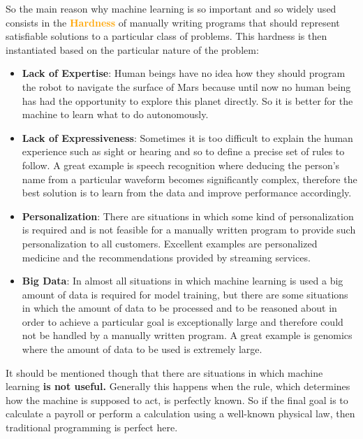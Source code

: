 \vspace{5mm}

So the main reason why machine learning is so important and so widely
used consists in the \textcolor{orange}{\textbf{Hardness}} of manually
writing programs that should represent satisfiable solutions to a
particular class of problems. This hardness is then instantiated based
on the particular nature of the problem:

\newpage

\begin{itemize}
    \item \textbf{Lack of Expertise}: Human beings have no idea how they
          should program the robot to navigate the surface of Mars
          because until now no human being has had the opportunity to
          explore this planet directly. So it is better for the machine
          to learn what to do autonomously.
    \item \textbf{Lack of Expressiveness}: Sometimes it is too difficult
          to explain the human experience such as sight or hearing and
          so to define a precise set of rules to follow. A great example
          is speech recognition where deducing the person's name from a
          particular waveform becomes significantly complex, therefore
          the best solution is to learn from the data and improve
          performance accordingly.
    \item \textbf{Personalization}: There are situations in which some
          kind of personalization is required and is not feasible for a
          manually written program to provide such personalization to all
          customers. Excellent examples are personalized medicine and the
          recommendations provided by streaming services.
    \item \textbf{Big Data}: In almost all situations in which machine
          learning is used a big amount of data is required for model
          training, but there are some situations in which the amount of
          data to be processed and to be reasoned about in order to
          achieve a particular goal is exceptionally large and therefore
          could not be handled by a manually written program. A great
          example is genomics where the amount of data to be used is
          extremely large.
\end{itemize}

\vspace{5mm}

It should be mentioned though that there are situations in which machine
learning \textbf{is not useful.} Generally this happens when the rule,
which determines how the machine is supposed to act, is perfectly known.
So if the final goal is to calculate a payroll or perform a calculation
using a well-known physical law, then traditional programming is perfect
here.

